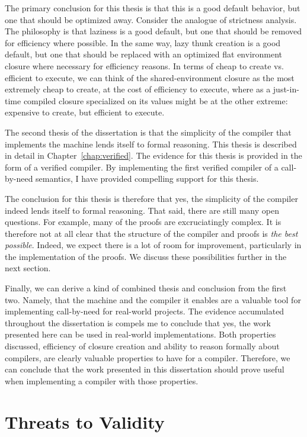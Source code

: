 The primary conclusion for this thesis is that this is a good default behavior,
but one that should be optimized away. Consider the analogue of strictness
analysis. The philosophy is that laziness is a good default, but one that should
be removed for efficiency where possible. In the same way, lazy thunk creation
is a good default, but one that should be replaced with an optimized flat
environment closure where necessary for efficiency reasons. In terms of cheap to
create vs. efficient to execute, we can think of the shared-environment closure
as the most extremely cheap to create, at the cost of efficiency to execute,
where as a just-in-time compiled closure specialized on its values might be at
the other extreme: expensive to create, but efficient to execute. 

The second thesis of the dissertation is that the simplicity of the compiler
that implements the \ce machine lends itself to formal reasoning. This thesis is
described in detail in Chapter~\ref{chap:verified}. The evidence for this thesis
is provided in the form of a verified compiler. By implementing the first
verified compiler of a call-by-need semantics, I have provided compelling
support for this thesis. 

The conclusion for this thesis is therefore that yes, the simplicity of the
compiler indeed lends itself to formal reasoning. That said, there are still
many open questions. For example, many of the proofs are excruciatingly complex.
It is therefore not at all clear that the structure of the compiler and proofs
is \emph{the best possible}. Indeed, we expect there is a lot of room for
improvement, particularly in the implementation of the proofs. We discuss these
possibilities further in the next section. 

Finally, we can derive a kind of combined thesis and conclusion from the first
two. Namely, that the \ce machine and the compiler it enables are a valuable
tool for implementing call-by-need for real-world projects. The evidence
accumulated throughout the dissertation is compels me to conclude that yes, the
work presented here can be used in real-world implementations. Both properties
discussed, efficiency of closure creation and ability to reason formally about
compilers, are clearly valuable properties to have for a compiler. Therefore, we
can conclude that the work presented in this dissertation should prove useful
when implementing a compiler with those properties. 

\section{Threats to Validity}


